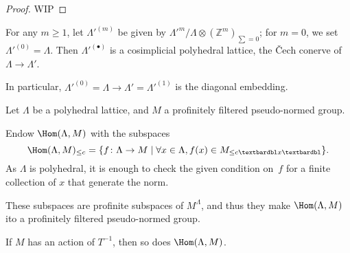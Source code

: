 \begin{proof}
  WIP
\end{proof}

\begin{definition}
  \label{cosimplicial-lattice}
  \leanok
  For any $m\geq 1$, let $\Lambda'^{(m)}$ be given by $\Lambda'^m / \Lambda\otimes (\mathbb Z^m)_{\sum=0}$;
  for $m=0$, we set $\Lambda'^{(0)} = \Lambda$.
  Then $\Lambda'^{(\bullet)}$ is a cosimplicial polyhedral lattice,
  the \v{C}ech conerve of $\Lambda\to \Lambda'$.

  In particular, $\Lambda'^{(0)} = \Lambda \to \Lambda' = \Lambda'^{(1)}$
  is the diagonal embedding.
\end{definition}

\begin{definition}
  \label{Hom}
  \leanok
  Let $\Lambda$ be a polyhedral lattice,
  and $M$ a profinitely filtered pseudo-normed group.

  Endow $\Hom(\Lambda, M)$ with the subspaces
  \[
    \Hom(\Lambda, M)_{\leq c} =
    \{f \colon \Lambda \to M \mid
      \forall x \in \Lambda, f(x) \in M_{\leq c‖x‖} \}.
  \]
  As $\Lambda$ is polyhedral, it is enough to check the given condition on~$f$
  for a finite collection of $x$ that generate the norm.

  These subspaces are profinite subspaces of $M^\Lambda$,
  and thus they make $\Hom(\Lambda, M)$ ito a profinitely filtered pseudo-normed group.

  If $M$ has an action of $T^{-1}$, then so does $\Hom(\Lambda, M)$.
\end{definition}


